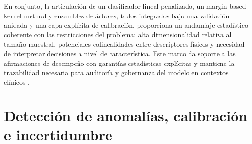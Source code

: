 En conjunto, la articulación de un clasificador lineal penalizado, un margin-based kernel method y ensambles de árboles, todos integrados bajo una validación anidada y una capa explícita de calibración, proporciona un andamiaje estadístico coherente con las restricciones del problema: alta dimensionalidad relativa al tamaño muestral, potenciales colinealidades entre descriptores físicos y necesidad de interpretar decisiones a nivel de característica. Este marco da soporte a las afirmaciones de desempeño con garantías estadísticas explícitas y mantiene la trazabilidad necesaria para auditoría y gobernanza del modelo en contextos clínicos \cite{Tsamardinos2022,Vabalas2019,Pedregosa2011,Friedman2001}.


\section{Detección de anomalías, calibración e incertidumbre}

